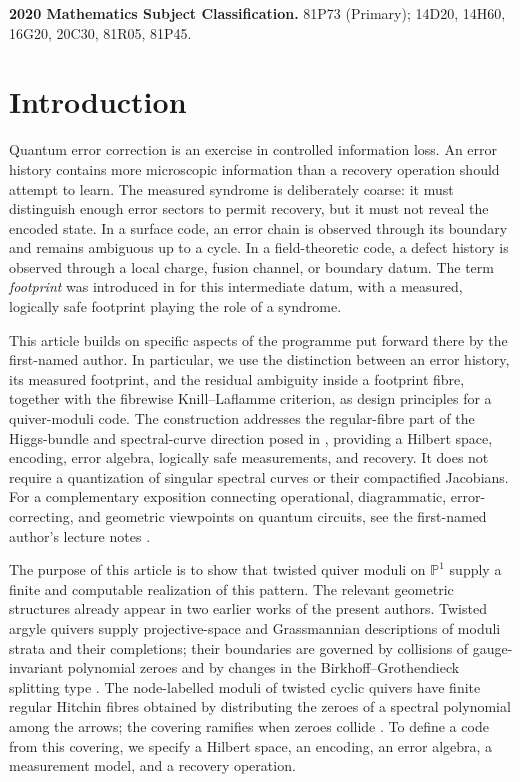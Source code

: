 \documentclass[11pt]{article}
\theoremstyle{definition}
\theoremstyle{remark}
\newcommand{\Pp}{\mathbb P}
\begin{document}
\medskip
\noindent\textbf{2020 Mathematics Subject Classification.}
81P73 (Primary); 14D20, 14H60, 16G20, 20C30, 81R05, 81P45.

\setcounter{tocdepth}{2}
\tableofcontents

\section{Introduction}

Quantum error correction is an exercise in controlled information loss.  An error history contains more microscopic information than a recovery operation should attempt to learn.  The measured syndrome is deliberately coarse: it must distinguish enough error sectors to permit recovery, but it must not reveal the encoded state.  In a surface code, an error chain is observed through its boundary and remains ambiguous up to a cycle.  In a field-theoretic code, a defect history is observed through a local charge, fusion channel, or boundary datum.  The term \emph{footprint} was introduced in \cite{RayanDiagrammatic2026} for this intermediate datum, with a measured, logically safe footprint playing the role of a syndrome.

This article builds on specific aspects of the programme put forward there by the first-named author.  In particular, we use the distinction between an error history, its measured footprint, and the residual ambiguity inside a footprint fibre, together with the fibrewise Knill--Laflamme criterion, as design principles for a quiver-moduli code.  The construction addresses the regular-fibre part of the Higgs-bundle and spectral-curve direction posed in \cite[Problem~11.12]{RayanDiagrammatic2026}, providing a Hilbert space, encoding, error algebra, logically safe measurements, and recovery.  It does not require a quantization of singular spectral curves or their compactified Jacobians.  For a complementary exposition connecting operational, diagrammatic, error-correcting, and geometric viewpoints on quantum circuits, see the first-named author's lecture notes \cite{RayanRethinking2026}.

The purpose of this article is to show that twisted quiver moduli on $\Pp^1$ supply a finite and computable realization of this pattern.  The relevant geometric structures already appear in two earlier works of the present authors.  Twisted argyle quivers supply projective-space and Grassmannian descriptions of moduli strata and their completions; their boundaries are governed by collisions of gauge-invariant polynomial zeroes and by changes in the Birkhoff--Grothendieck splitting type \cite{RayanSundboArgyle2018}.  The node-labelled moduli of twisted cyclic quivers have finite regular Hitchin fibres obtained by distributing the zeroes of a spectral polynomial among the arrows; the covering ramifies when zeroes collide \cite{RayanSundboCyclic2021}.  To define a code from this covering, we specify a Hilbert space, an encoding, an error algebra, a measurement model, and a recovery operation.
\end{document}
